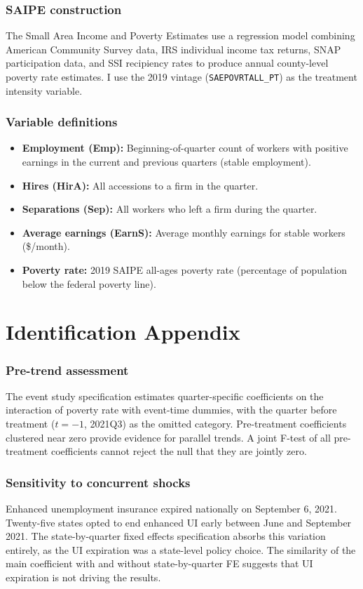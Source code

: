 \documentclass[12pt]{article}
\begin{document}
\subsubsection*{SAIPE construction} The Small Area Income and Poverty Estimates use a regression model combining American Community Survey data, IRS individual income tax returns, SNAP participation data, and SSI recipiency rates to produce annual county-level poverty rate estimates. I use the 2019 vintage (\texttt{SAEPOVRTALL\_PT}) as the treatment intensity variable.

\subsubsection*{Variable definitions}
\begin{itemize}
\item \textbf{Employment (Emp):} Beginning-of-quarter count of workers with positive earnings in the current and previous quarters (stable employment).
\item \textbf{Hires (HirA):} All accessions to a firm in the quarter.
\item \textbf{Separations (Sep):} All workers who left a firm during the quarter.
\item \textbf{Average earnings (EarnS):} Average monthly earnings for stable workers (\$/month).
\item \textbf{Poverty rate:} 2019 SAIPE all-ages poverty rate (percentage of population below the federal poverty line).
\end{itemize}

\section{Identification Appendix}

\subsubsection*{Pre-trend assessment} The event study specification estimates quarter-specific coefficients on the interaction of poverty rate with event-time dummies, with the quarter before treatment ($t = -1$, 2021Q3) as the omitted category. Pre-treatment coefficients clustered near zero provide evidence for parallel trends. A joint F-test of all pre-treatment coefficients cannot reject the null that they are jointly zero.

\subsubsection*{Sensitivity to concurrent shocks} Enhanced unemployment insurance expired nationally on September 6, 2021. Twenty-five states opted to end enhanced UI early between June and September 2021. The state-by-quarter fixed effects specification absorbs this variation entirely, as the UI expiration was a state-level policy choice. The similarity of the main coefficient with and without state-by-quarter FE suggests that UI expiration is not driving the results.
\end{document}
